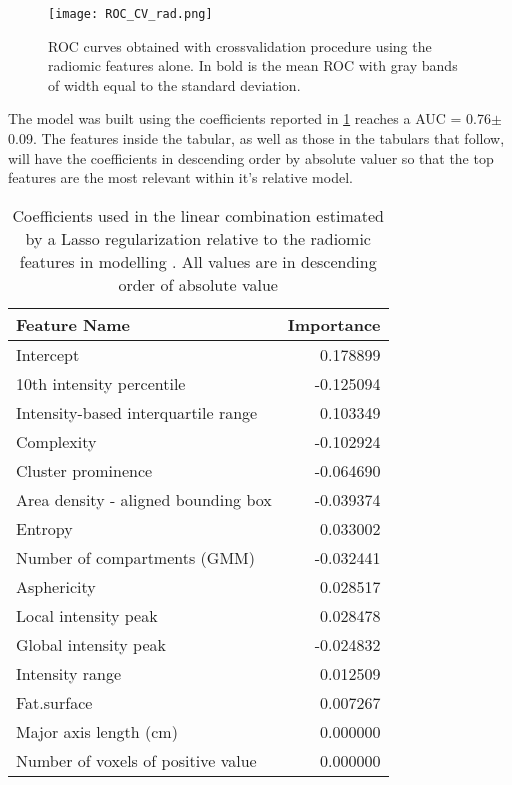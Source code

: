 \begin{figure}[htbp]
	\centering
  		\texttt{[image: ROC\_CV\_rad.png]}
        \caption{ROC curves obtained with crossvalidation procedure using the radiomic features alone. In bold is the mean ROC with gray bands of width equal to the standard deviation. \label{RocDeathRad}}
\end{figure}

The model was built using the coefficients reported in \ref{tab:ParamRad} reaches a AUC = 0.76$\pm$0.09. The features inside the tabular, as well as those in the tabulars that follow, will have the coefficients in descending order by absolute valuer so that the top features are the most relevant within it's relative model.

\begin{table}
\caption{Coefficients used in the linear combination estimated by a Lasso regularization relative to the radiomic features in modelling \death. All values are in descending order of absolute value\label{tab:ParamRad}}
\centering 
	\begin{tabular}{lr}
		\toprule
		Feature Name &   Importance \\
		\midrule
		Intercept                           &                      0.178899 \\
		10th intensity percentile           &                     -0.125094 \\
		Intensity-based interquartile range &                      0.103349 \\
		Complexity                          &                     -0.102924 \\
		Cluster prominence                  &                     -0.064690 \\
		Area density - aligned bounding box &                     -0.039374 \\
		Entropy                             &                      0.033002 \\
		Number of compartments (GMM)        &                     -0.032441 \\
		Asphericity                         &                      0.028517 \\
		Local intensity peak                &                      0.028478 \\
		Global intensity peak               &                     -0.024832 \\
		Intensity range                     &                      0.012509 \\
		Fat.surface                         &                      0.007267 \\
		Major axis length (cm)              &                      0.000000 \\
		Number of voxels of positive value  &                      0.000000 \\
		\bottomrule
	\end{tabular}
\end{table}

